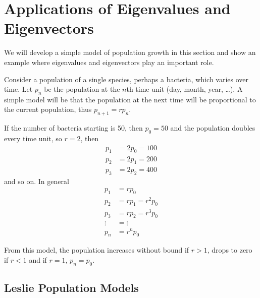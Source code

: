 \section[Applications]{Applications of Eigenvalues and Eigenvectors}

We will develop a simple model of population growth in this section and show an example where eigenvalues and eigenvectors play an important role.  

Consider a population of a single species, perhaps a bacteria, which varies over time.  Let $p_n$ be the population at the $n$th time unit (day, month, year, \ldots).  A simple model will be that the population at the next time will be proportional to the current population, thus $p_{n+1} = r p_n$.  

If the number of bacteria starting is 50, then $p_0=50$ and the population doubles every time unit, so $r=2$, then 
% 
\begin{align*}
 p_1 &= 2 p_0 = 100 \\
 p_2 & = 2p_1 = 200 \\
 p_3 & = 2p_2 = 400
\end{align*}
and so on.  In general
% 
\begin{align*}
 p_1 & = r p_0 \\
 p_2 & = r p_1 = r^2 p_0 \\
 p_3 & = r p_2 = r^3 p_0 \\
 \vdots & = \vdots \\
 p_n &= r^n p_0 
\end{align*}

From this model, the population increases without bound if $r>1$, drops to zero if $r<1$ and if $r=1$, $p_n =p_0$.  

\subsection{Leslie Population Models}  

